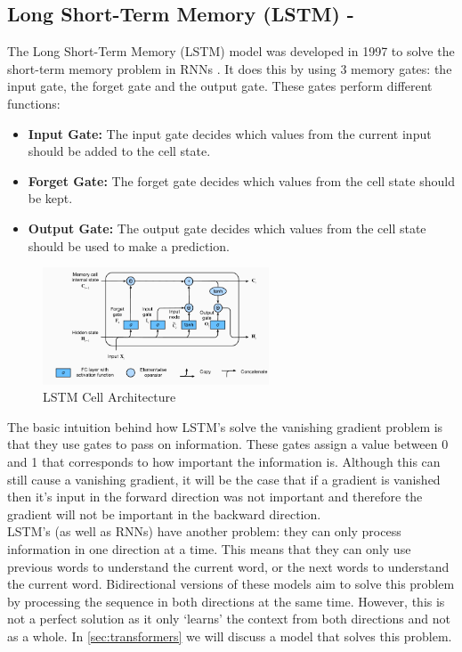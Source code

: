 \subsection{Long Short-Term Memory (LSTM) - \cite{lstm}}
The Long Short-Term Memory (LSTM) model was developed in 1997 to solve the short-term memory problem in RNNs \cite{lstm}. It does this by
using 3 memory gates: the input gate, the forget gate and the output gate. These gates perform different functions:
\begin{itemize}
    \item \textbf{Input Gate:} The input gate decides which values from the current input should be added to the cell state.
    \item \textbf{Forget Gate:} The forget gate decides which values from the cell state should be kept.
    \item \textbf{Output Gate:} The output gate decides which values from the cell state should be used to make a prediction.
\end{itemize}
\begin{figure}[hbtp]
    \centering
    \includegraphics[width=0.6\textwidth]{../images/lstm.png}
    \caption{LSTM Cell Architecture}
    \label{fig:lstm}
\end{figure}
The basic intuition behind how LSTM's solve the vanishing gradient problem is that they use gates to pass on information.
These gates assign a value between 0 and 1 that corresponds to how important the information is. Although this can still
cause a vanishing gradient, it will be the case that if a gradient is vanished then it's input in the forward direction
was not important and therefore the gradient will not be important in the backward direction.\\

LSTM's (as well as RNNs) have another problem: they can only process information in one direction at a time. This means that 
they can only use previous words to understand the current word, or the next words to understand the current word. Bidirectional
versions of these models aim to solve this problem by processing the sequence in both directions at the same time. However, this
is not a perfect solution as it only `learns' the context from both directions and not as a whole. In \cref{sec:transformers}
we will discuss a model that solves this problem.
